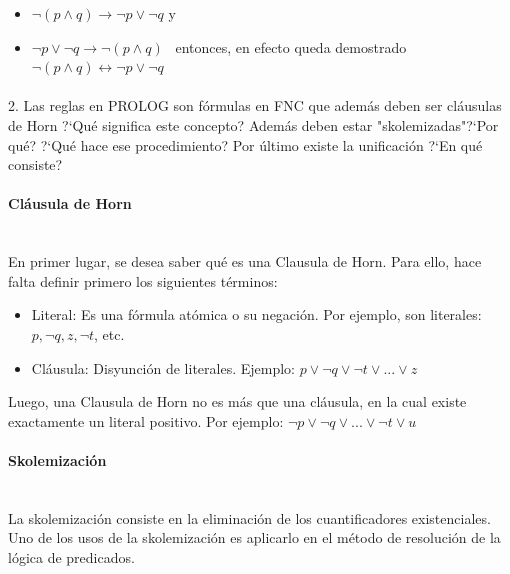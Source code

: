 \documentclass{article}
\begin{document}
\begin{itemize}
Como se demostr\'o que se cumple: \
\item $\neg (p \land q) \rightarrow \neg p \lor \neg q$ y \
\item $\neg p \lor \neg q \rightarrow \neg (p \land q)$ \
entonces, en efecto queda demostrado
$\neg (p \land q) \leftrightarrow \neg p \lor \neg q$
\end{itemize}

\paragraph{}

2. Las reglas en PROLOG son f\'ormulas en FNC que adem\'as deben ser cl\'ausulas de Horn ?`Qu\'e significa este concepto? Adem\'as deben estar "skolemizadas"?`Por qu\'e? ?`Qu\'e hace ese procedimiento? Por \'ultimo existe la unificaci\'on ?`En qu\'e consiste?

\paragraph{Cl\'ausula de Horn}\mbox{}\\

En primer lugar, se desea saber qu\'e es una Clausula de Horn. Para ello, hace falta definir primero los siguientes t\'erminos:

\begin{itemize}

\item Literal: Es una f\'ormula at\'omica o su negaci\'on. Por ejemplo, son literales: $p, \neg q, z, \neg t$, etc.
\item Cl\'ausula: Disyunci\'on de literales. Ejemplo: $ p \lor \neg q \lor \neg t \lor ... \lor z $ 

\end{itemize}

Luego, una Clausula de Horn no es m\'as que una cl\'ausula, en la cual existe exactamente un literal positivo. Por ejemplo: $ \neg p \lor \neg q \lor ... \lor \neg t \lor u$ 

\paragraph{Skolemizaci\'on}\mbox{}\\

La skolemizaci\'on consiste en la eliminaci\'on de los cuantificadores existenciales.
Uno de los usos de la skolemizaci\'on es aplicarlo en el m\'etodo de resoluci\'on de la l\'ogica de predicados.
\end{document}
